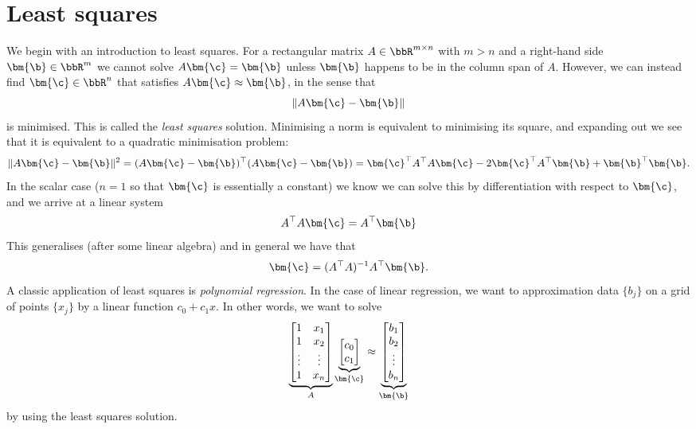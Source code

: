 \section{Least squares}
We begin with an introduction to least squares.  For a rectangular matrix $A \ensuremath{\in} \ensuremath{\bbR}^{m \ensuremath{\times} n}$ with $m > n$ and a right-hand side $\ensuremath{\bm{\b}} \ensuremath{\in} \ensuremath{\bbR}^m$ we cannot solve $A \ensuremath{\bm{\c}} = \ensuremath{\bm{\b}}$ unless $\ensuremath{\bm{\b}}$ happens to be in the column span of $A$. However, we can instead find $\ensuremath{\bm{\c}} \ensuremath{\in} \ensuremath{\bbR}^n$ that satisfies $A \ensuremath{\bm{\c}} \ensuremath{\approx} \ensuremath{\bm{\b}}$, in the sense that
\[
\| A\ensuremath{\bm{\c}} - \ensuremath{\bm{\b}}\|
\]
is minimised. This is called the \emph{least squares} solution.  Minimising a norm is equivalent to minimising its square, and expanding out we see that it is equivalent to a quadratic minimisation problem:
\[
\| A\ensuremath{\bm{\c}} - \ensuremath{\bm{\b}}\|^2 = (A\ensuremath{\bm{\c}} - \ensuremath{\bm{\b}})^\ensuremath{\top} (A\ensuremath{\bm{\c}} - \ensuremath{\bm{\b}}) = \ensuremath{\bm{\c}}^\ensuremath{\top} A^\ensuremath{\top} A \ensuremath{\bm{\c}} - 2 \ensuremath{\bm{\c}}^\ensuremath{\top} A^\ensuremath{\top} \ensuremath{\bm{\b}}  + \ensuremath{\bm{\b}}^\ensuremath{\top} \ensuremath{\bm{\b}}.
\]
In the scalar case ($n = 1$ so that $\ensuremath{\bm{\c}}$ is essentially a constant) we know we can solve this by differentiation with respect to $\ensuremath{\bm{\c}}$, and we arrive at a linear system
\[
 A^\ensuremath{\top} A \ensuremath{\bm{\c}}  =  A^\ensuremath{\top} \ensuremath{\bm{\b}}
\]
This generalises (after some linear algebra) and in general we have that
\[
\ensuremath{\bm{\c}} =  (A^\ensuremath{\top} A)^{-1} A^\ensuremath{\top} \ensuremath{\bm{\b}}.
\]
A classic application of least squares is \emph{polynomial regression}. In the case of linear regression, we want to approximation data $\{b_j\}$ on a grid of points $\{x_j\}$ by a linear function $c_0 + c_1 x$. In other words, we want to solve
\[
\underbrace{\begin{bmatrix} 1 & x_1 \\
1 & x_2 \\
\ensuremath{\vdots} & \ensuremath{\vdots} \\
1 & x_n
\end{bmatrix}}_A \underbrace{\begin{bmatrix} c_0 \\
c_1
\end{bmatrix}}_{\ensuremath{\bm{\c}}} \ensuremath{\approx} \underbrace{\begin{bmatrix}
b_1 \\
b_2 \\
\ensuremath{\vdots} \\
b_n
\end{bmatrix}}_{\ensuremath{\bm{\b}}}
\]
by using the least squares solution.

